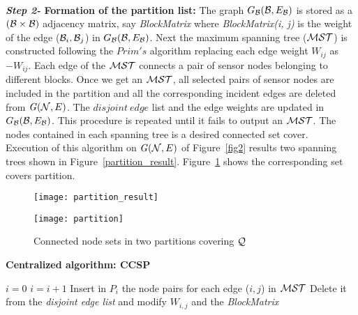 \documentclass{acm_proc_article-sp}
\begin{document}
 \\{\bf {\it Step 2-} Formation of the partition list:} The graph $G_{\cal B}({\cal B},E_{\cal B})$ is stored as a $({\cal B}\times{\cal B})$ adjacency matrix, say {\it BlockMatrix} where {\it BlockMatrix(i, j)} is the weight of the edge (${\cal B}_i, {\cal B}_j$) in $G_{\cal B}({\cal B},E_{\cal B})$. Next the maximum spanning tree ($\cal MST$) is constructed following the $Prim's$ algorithm replacing each edge weight $W_{ij}$ as $-W_{ij}$. Each edge of the $\cal MST$ connects a pair of sensor nodes belonging to different blocks. Once we get an $\cal MST$, all selected pairs of sensor nodes are included in the partition and all the corresponding incident edges are deleted from ${{\it G}}({\cal N}, E)$. The $disjoint\ edge$ list and the edge weights are updated in $G_{\cal B}({\cal B},E_{\cal B})$. This procedure is repeated until it fails to output an $\cal MST$. The nodes contained in each spanning tree is a desired connected set cover.\\
 Execution of this algorithm on ${{\it G}}({\cal N}, E)$ of Figure~\ref{fig2} results two spanning trees shown in Figure~\ref{partition_result}. Figure~\ref{active_partition} shows the corresponding set covers partition.
  \begin{figure}[ht!]
\begin{minipage}[b]{0.5\linewidth}
		  \centering
		 \texttt{[image: partition\_result]}
	    \caption{\scriptsize{Two MST's from $G_{\cal B}({\cal B},E_{\cal B})$ of Figure \ref{fig4}}}
	     \label{partition_result}
	      \end{minipage}
	      \hspace{0.5cm}
	      \begin{minipage}[b]{0.4\linewidth}
		  \centering
		   \texttt{[image: partition]}
	    \caption{\scriptsize{Connected node sets in two partitions covering $\cal Q$}}
	    \label{active_partition}
		\end{minipage}
		\end{figure}
		
	\vspace{-0.2cm}
{\bf  Centralized algorithm: CCSP }
   \begin{algorithm}[ht]
         \scriptsize
        \SetLine
\caption{\scriptsize{Centralized algorithm: CCSP}}
	$i=0$\;
        {
	  $i=i+1$\;
               Insert in $P_i$ the node pairs for each edge ($i, j$) in $\cal MST$\;
	       Delete it from the {\it disjoint edge list} and modify $W_{i, j}$ and the {\it BlockMatrix} \;
	      }
  \normalsize
  \end{algorithm}
  \vspace{-0.6cm}
\end{document}
